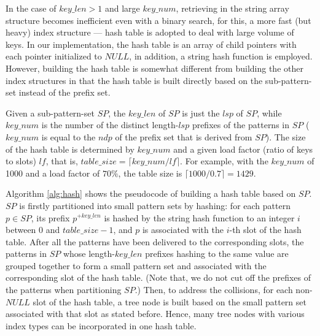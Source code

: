 \documentclass[legalpaper]{article}
\begin{document}
In the case of $key\_len > 1$ and large $key\_num$, retrieving in the
string array structure becomes inefficient even with a binary search,
for this, a more fast (but heavy) index structure --- \textsf{hash
table} is adopted to deal with large volume of keys. In our
implementation, the hash table is an array of child pointers with each
pointer initialized to $NULL$, in addition, a \textsf{string hash
function} is employed. However, building the hash table is somewhat
different from building the other index structures in that the hash
table is built directly based on the sub-pattern-set instead of the
prefix set.


Given a sub-pattern-set $SP$, the $key\_len$ of $SP$ is just the $lsp$
of $SP$, while $key\_num$ is the number of the distinct length-$lsp$
prefixes of the patterns in $SP$ ( $key\_num$ is equal to the $ndp$ of
the prefix set that is derived from $SP$).  The size of the hash table
is determined by $key\_num$ and a given \textsf{load factor} (ratio of
keys to slots) $lf$, that is, $table\_size = \lceil key\_num/lf
\rceil$. For example, with the $key\_num$ of 1000 and a load factor of
$70\%$, the table size is $\lceil 1000/0.7 \rceil = 1429$.

Algorithm \ref{alg:hash} shows the pseudocode of building a hash table
based on $SP$. $SP$ is firstly partitioned into small pattern sets by
hashing: for each pattern $p \in SP$, its prefix $p^{+key\_len}$ is
hashed by the string hash function to an integer $i$ between 0 and
$table\_size-1$, and $p$ is associated with the $i$-th slot of the
hash table. After all the patterns have been delivered to the
corresponding slots, the patterns in $SP$ whose length-$key\_len$
prefixes hashing to the same value are grouped together to form a
small pattern set and associated with the corresponding slot of the
hash table. (Note that, we do not cut off the prefixes of the patterns
when partitioning $SP$.) Then, to address the collisions, for each
non-$NULL$ slot of the hash table, a tree node is built based on the
small pattern set associated with that slot as stated before. Hence,
many tree nodes with various index types can be incorporated in one
hash table.
\end{document}
